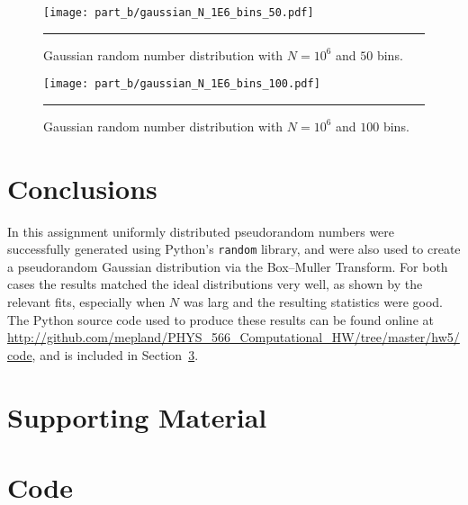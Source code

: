 \documentclass[notitlepage,aps,prd,nofootinbib]{revtex4-1}
\begin{document}
\begin{figure}[!htbc]
  \centering
  \texttt{[image: part\_b/gaussian\_N\_1E6\_bins\_50.pdf]}
	{\par\nobreak\rule[9pt]{35em}{0.5pt}\vspace{-5mm}}
	\caption{Gaussian random number distribution with $N = 10^6$ and $50$ bins.}
	\label{fig:gaussian_N_1E6_bins_50}
\end{figure}

\begin{figure}[!htbc]
  \centering
  \texttt{[image: part\_b/gaussian\_N\_1E6\_bins\_100.pdf]}
	{\par\nobreak\rule[9pt]{35em}{0.5pt}\vspace{-5mm}}
	\caption{Gaussian random number distribution with $N = 10^6$ and $100$ bins.}
	\label{fig:gaussian_N_1E6_bins_100}
\end{figure}



\clearpage
\section{Conclusions}
\label{sec:Conclusions}
In this assignment uniformly distributed pseudorandom numbers were successfully generated using Python's \texttt{random} library, and were also used to create a pseudorandom Gaussian distribution via the Box--Muller Transform. For both cases the results matched the ideal distributions very well, as shown by the relevant fits, especially when $N$ was larg and the resulting statistics were good. The Python source code used to produce these results can be found online at \url{http://github.com/mepland/PHYS_566_Computational_HW/tree/master/hw5/code}, and is included in Section~\ref{sec:code}.


\section{Supporting Material}
\label{sec:Supporting_Material}




\clearpage


\clearpage
\section{Code}
\label{sec:code}


\end{document}
